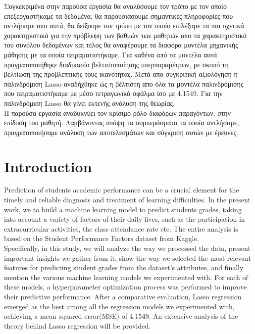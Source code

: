 \documentclass[12pt]{article}
\begin{document}
Συγκεκριμένα στην παρούσα εργασία θα αναλύσουμε τον τρόπο με τον οποίο επεξεργαστήκαμε τα δεδομένα, θα παρουσιάσουμε σημαντικές πληροφορίες που αντλήσαμε απο αυτά, θα δείξουμε τον τρόπο με τον οποίο επιλέξαμε τα πιο σχετικά χαρακτηριστικά για την πρόβλεψη των βαθμών των μαθητών απο τα χαρακτηριστικά του συνόλου δεδομένων και τέλος θα αναφέρουμε τα διαφόρα μοντέλα μηχανικής μάθησης με τα οποία πειραματιστήκαμε. Για καθένα από τα μοντέλα αυτά πραγματοποιήθηκε διαδικασία βελτιστοποίησης υπερπαραμέτρων, με σκοπό τη βελτίωση της προβλεπτικής τους ικανότητας. Μετά απο συγκριτική αξιολόγηση η παλινδρόμιση Lasso αναδήχθηκε ώς η βέλτιστη απο όλα τα μοντέλα παλινδρόμισης που πειραματιστήκαμε με μέσο τετραγωνικό σφάλμα ίσο με 4.1549. Για την παλινδρόμιση Lasso θα γίνει εκτενής ανάλυση της θεωρίας.
\\

Η παρούσα εργασία αναδυκνύει τον κρίσιμο ρόλο διαφόρων παραγόντων, στην επίδοση του μαθητή. Λαμβάνοντας υπόψη τα συμπεράσματα τα οποία αντλήσαμε, πραγματοποιήσαμε ανάλυση των αποτελεσμάτων και σύγκριση αυτών με έρευνες.
\newpage

\section*{Introduction}
Prediction of students academic performance can be a crucial element for the timely and reliable diagnosis and treatment of learning difficulties. In the present work, we to build a machine learning model to predict students grades, taking into account a variety of factors of their daily lives, such as the participation in extracurricular activities, the class attendance rate etc. The entire analysis is based on the Student Performance Factors dataset from Kaggle.
\\

Specifically, in this study, we will analyze the way we processed the data, present important insights we gather from it, show the way we selected the most relevant features for predicting student grades from the dataset's attributes, and finally mention the various machine learning models we experimented with. For each of these models, a hyperparameter optimization process was performed to improve their predictive performance. After a comparative evaluation, Lasso regression emerged as the best among all the regression models we experimented with, achieving a mean squared error(MSE) of 4.1549. An extensive analysis of the theory behind Lasso regression will be provided.
\\
\end{document}

